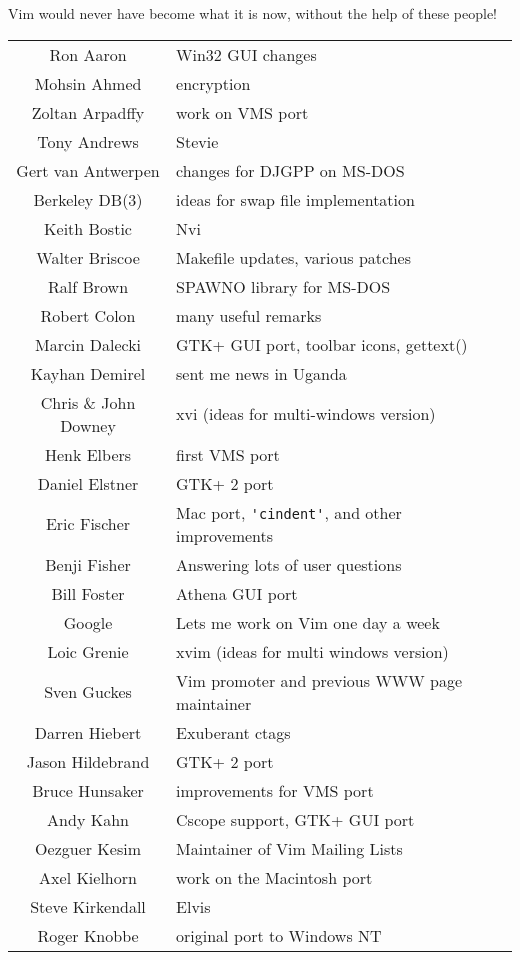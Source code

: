 Vim would never have become what it is now, without the help of these people!
\begin{longtable}{c l}
				Ron Aaron & Win32 GUI changes\\
				Mohsin Ahmed & encryption\\
				Zoltan Arpadffy & work on VMS port\\
				Tony Andrews & Stevie\\
				Gert van Antwerpen & changes for DJGPP on MS-DOS\\
				Berkeley DB(3) & ideas for swap file implementation\\
				Keith Bostic & Nvi\\
				Walter Briscoe & Makefile updates, various patches\\
				Ralf Brown & SPAWNO library for MS-DOS\\
				Robert Colon & many useful remarks\\
				Marcin Dalecki & GTK+ GUI port, toolbar icons, gettext()\\
				Kayhan Demirel & sent me news in Uganda\\
				Chris \& John Downey & xvi (ideas for multi-windows version)\\
				Henk Elbers & first VMS port\\
				Daniel Elstner & GTK+ 2 port\\
				Eric Fischer & Mac port, \verb!'cindent'!, and other improvements\\
				Benji Fisher & Answering lots of user questions\\
				Bill Foster & Athena GUI port\\
				Google & Lets me work on Vim one day a week\\
				Loic Grenie & xvim (ideas for multi windows version)\\
				Sven Guckes & Vim promoter and previous WWW page maintainer\\
				Darren Hiebert & Exuberant ctags\\
				Jason Hildebrand & GTK+ 2 port\\
				Bruce Hunsaker & improvements for VMS port\\
				Andy Kahn & Cscope support, GTK+ GUI port\\
				Oezguer Kesim & Maintainer of Vim Mailing Lists\\
				Axel Kielhorn & work on the Macintosh port\\
				Steve Kirkendall & Elvis\\
				Roger Knobbe & original port to Windows NT\\

\end{longtable}
